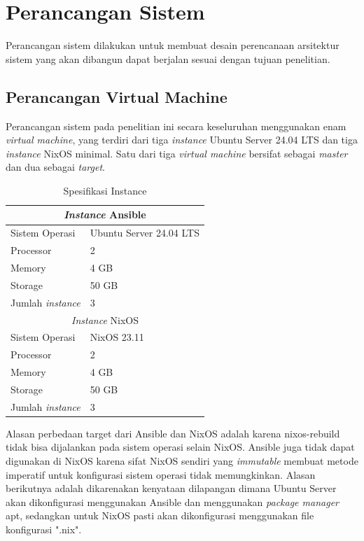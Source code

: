\documentclass[10pt,twoside]{report}
\begin{document}
\section{Perancangan Sistem}

\begin{adjustwidth}{20pt}{}
	Perancangan sistem dilakukan untuk membuat desain perencanaan arsitektur
	sistem yang akan dibangun dapat berjalan sesuai dengan tujuan penelitian.
	\subsection{Perancangan Virtual Machine}
	\begin{adjustwidth}{20pt}{}
		Perancangan sistem pada penelitian ini secara keseluruhan menggunakan enam
		\textit{virtual machine}, yang terdiri dari tiga \textit{instance} Ubuntu
		Server 24.04 LTS dan tiga \textit{instance} NixOS minimal.
		Satu dari tiga \textit{virtual machine} bersifat sebagai \textit{master}
		dan dua sebagai \textit{target}.
		\begin{table}[H]
			\centering
			\caption{Spesifikasi Instance}
			\begin{tabular}{|l|l|}
				\hline
				\multicolumn{2}{|c|}{\textit{Instance} Ansible}    \\
				\hline
				Sistem Operasi           & Ubuntu Server 24.04 LTS \\
				\hline
				Processor                & 2                       \\
				\hline
				Memory                   & 4 GB                    \\
				\hline
				Storage                  & 50 GB                   \\
				\hline
				Jumlah \textit{instance} & 3                       \\
				\hline
				\multicolumn{2}{|c|}{\textit{Instance} NixOS}      \\
				\hline
				Sistem Operasi           & NixOS 23.11             \\
				\hline
				Processor                & 2                       \\
				\hline
				Memory                   & 4 GB                    \\
				\hline
				Storage                  & 50 GB                   \\
				\hline
				Jumlah \textit{instance} & 3                       \\
				\hline
			\end{tabular}
		\end{table}
		Alasan perbedaan target dari Ansible dan NixOS adalah karena nixos-rebuild
		tidak bisa dijalankan pada sistem operasi selain NixOS. Ansible juga tidak
		dapat digunakan di NixOS karena sifat NixOS sendiri yang \textit{immutable}
		membuat metode imperatif untuk konfigurasi sistem operasi tidak memungkinkan.
		Alasan berikutnya adalah dikarenakan kenyataan dilapangan dimana Ubuntu Server
		akan dikonfigurasi menggunakan Ansible dan menggunakan \textit{package manager} apt,
		sedangkan untuk NixOS pasti akan dikonfigurasi menggunakan file konfigurasi ".nix".
	\end{adjustwidth}

\end{adjustwidth}
\end{document}
